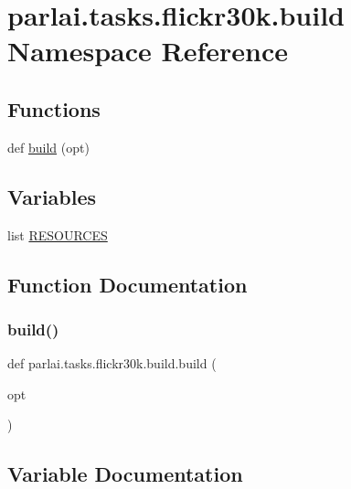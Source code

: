 \hypertarget{namespaceparlai_1_1tasks_1_1flickr30k_1_1build}{}\section{parlai.\+tasks.\+flickr30k.\+build Namespace Reference}
\label{namespaceparlai_1_1tasks_1_1flickr30k_1_1build}
\subsection*{Functions}
\begin{DoxyCompactItemize}
\item 
def \hyperlink{namespaceparlai_1_1tasks_1_1flickr30k_1_1build_a45b58a1c8d68443baba41a4f9290967d}{build} (opt)
\end{DoxyCompactItemize}
\subsection*{Variables}
\begin{DoxyCompactItemize}
\item 
list \hyperlink{namespaceparlai_1_1tasks_1_1flickr30k_1_1build_abd16c32208cabae507c611c0c7d641c9}{R\+E\+S\+O\+U\+R\+C\+ES}
\end{DoxyCompactItemize}


\subsection{Function Documentation}
\mbox{\label{namespaceparlai_1_1tasks_1_1flickr30k_1_1build_a45b58a1c8d68443baba41a4f9290967d}} 
\subsubsection{\texorpdfstring{build()}{build()}}
{\footnotesize\ttfamily def parlai.\+tasks.\+flickr30k.\+build.\+build (\begin{DoxyParamCaption}\item[{}]{opt }\end{DoxyParamCaption})}



\subsection{Variable Documentation}
\mbox{\label{namespaceparlai_1_1tasks_1_1flickr30k_1_1build_abd16c32208cabae507c611c0c7d641c9}} 
